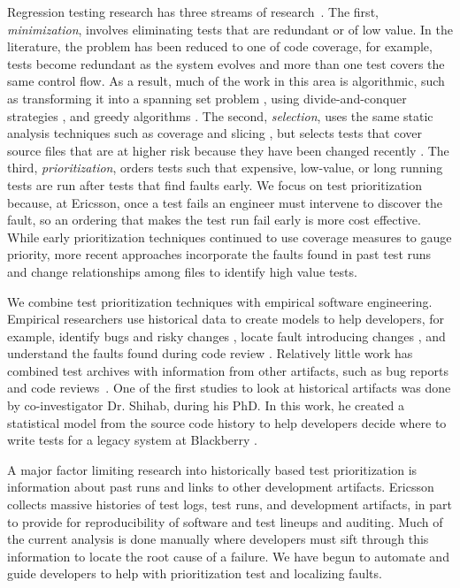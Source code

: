 Regression testing research has three streams of research~\cite{Yoo2012STVR}.
%
%
The first, {\it minimization}, involves eliminating tests that are redundant or
of low value. In the literature, the problem has been reduced to one of code
coverage, for example, tests become redundant as the system evolves and more
than one test covers the same control flow. As a result, much of the work in
this area is algorithmic, such as transforming it into a spanning set problem
\cite{Marre2003TSE}, using divide-and-conquer strategies \cite{Chen1996IPL},
and greedy algorithms \cite{Tallam2005SENotes}. 
%
The second, {\it selection}, uses the same static analysis techniques such as
coverage \cite{Taha1989COMPSAC} and slicing \cite{Jeffrey2006COMPSAC}, but
selects tests that cover source files that are at higher risk because they have
been changed recently \cite{Rothermel1994ICSE}. 
%
The third, {\it prioritization}, orders tests such that expensive, low-value,
or long running tests are run after tests that find faults early.  We
focus on test prioritization because, at Ericsson, once a test fails an
engineer must intervene to discover the fault, so an ordering that makes the
test run fail early is more cost effective.
While early prioritization techniques continued to use coverage measures to
gauge priority, more recent approaches incorporate the faults found in past
test runs \cite{Kim2002ICSE} and change relationships among files
\cite{Sherriff2007ISSRE} to identify high value tests. 

We combine test prioritization techniques with empirical software engineering.
Empirical researchers use historical data to create models to help developers,
for example, identify bugs and risky changes \cite{DAmbros2010MSR}, locate
fault introducing changes \cite{Kim2006ASE}, and understand the faults found
during code review \cite{Rigby2014TOSEM}.
Relatively little work has combined test archives with information from other
artifacts, such as bug reports and code
reviews~\cite{Shihab2011SPE,Herzig2014ISSRE}. One of the first studies to look
at historical artifacts was done by co-investigator Dr. Shihab, during his PhD.
In this work, he created a statistical model from the source code history to
help developers decide where to write tests for a legacy system at Blackberry
\cite{Shihab2011SPE}.

A major factor limiting research into historically based test prioritization is
information about past runs and links to other development artifacts.  Ericsson
collects massive histories of test logs, test runs, and development artifacts, in
part to provide for reproducibility of software and test lineups and auditing.
Much of the current analysis is done manually where developers must sift
through this information to locate the root cause of a failure. We have begun
to automate and guide developers to help with prioritization test and
localizing faults.


